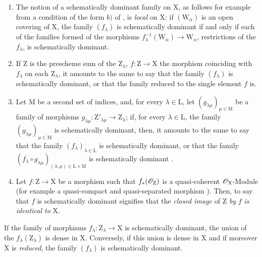 \begin{remarks}[11.10.3]
\label{IV.11.10.3}
\medskip\noindent
\begin{enumerate}[label=(\roman*)]
  \item The notion of a schematically dominant family on $\mathrm{X}$, as follows for example from a condition of the form $b)$ of , is \emph{local} on $\mathrm{X}$: if $(\mathrm{W}_\alpha)$ is an open covering of $\mathrm{X}$, the family $(f_\lambda)$ is schematically dominant if and only if each of the families formed of the morphisms $f_\lambda^{-1}(\mathrm{W}_\alpha)\to\mathrm{W}_\alpha$, restrictions of the $f_\lambda$, is schematically dominant.
  \item If $\mathrm{Z}$ is the prescheme sum of the $\mathrm{Z}_\lambda$, $f:\mathrm{Z}\to\mathrm{X}$ the morphism coinciding with $f_\lambda$ on each $\mathrm{Z}_\lambda$, it amounts to the same to say that the family $(f_\lambda)$ is schematically dominant, or that the family reduced to the single element $f$ is.
  \item Let $\mathrm{M}$ be a second set of indices, and, for every $\lambda\in\mathrm{L}$, let $(g_{\lambda\mu})_{\mu\in\mathrm{M}}$ be a family of morphisms $g_{\lambda\mu}:\mathrm{Z}'_{\lambda\mu}\to\mathrm{Z}_\lambda$; if, for every $\lambda\in\mathrm{L}$, the family $(g_{\lambda\mu})_{\mu\in\mathrm{M}}$ is schematically dominant, then, it amounts to the same to say that the family $(f_\lambda)_{\lambda\in\mathrm{L}}$ is schematically dominant, or that the family $(f_\lambda\circ g_{\lambda\mu})_{(\lambda,\mu)\in\mathrm{L}\times\mathrm{M}}$ is schematically dominant .
  \item Let $f:\mathrm{Z}\to\mathrm{X}$ be a morphism such that $f_*(\mathscr{O}_\mathrm{Z})$ is a quasi-coherent $\mathscr{O}_\mathrm{X}$-Module (for example a quasi-compact and quasi-separated morphism ).
  Then, to say that $f$ is schematically dominant signifies that the \emph{closed image} of $\mathrm{Z}$ \emph{by} $f$  \emph{is identical to} $\mathrm{X}$.
\end{enumerate}
\end{remarks}

\begin{proposition}[11.10.4]
\label{IV.11.10.4}
If the family of morphisms $f_\lambda:\mathrm{Z}_\lambda\to\mathrm{X}$ is schematically dominant, the union of the $f_\lambda(\mathrm{Z}_\lambda)$ is dense in $\mathrm{X}$.
Conversely, if this union is dense in $\mathrm{X}$ and if moreover $\mathrm{X}$ is \emph{reduced}, the family $(f_\lambda)$ is schematically dominant.
\end{proposition}

